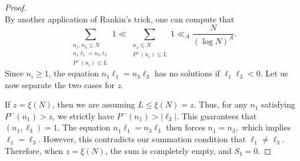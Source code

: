 \documentclass[10pt,a4paper]{amsart}
\renewcommand{\geq}{\geqslant}
\renewcommand{\l}{\ell}
\renewcommand{\le}{\leqslant}
\renewcommand{\leq}{\leqslant}
\begin{document}
\begin{proof}
\begin{equation}
		\end{equation}
		By another application of Rankin's trick, one can compute that 
		\begin{equation}\label{eq: proof lem 4.3 1}
			\sum_{\substack{n_1,n_3 \le N \\ n_1\l_1=n_3\l_3  \\ P^+(n_i) \leq L }} 1 \ll \sum_{\substack{n_1\leq N \\ P^+(n_i) \leq L }} 1 \ll_A \frac{N}{(\log N)^A}.
		\end{equation}
		Since $n_i \geq 1$, the equation $n_1\l_1=n_3\l_3$ has no solutions if $\l_1\l_3 < 0$. Let us now separate the two cases for $z$. 
		
		If $z = \xi(N)$, then we are assuming $L \leq \xi(N) = z$. Thus, for any $n_1$ satisfying $P^-(n_1) > z$, we strictly have $P^-(n_1) > |\l_3|$. This guarantees that $(n_1,\l_3) = 1$. The equation $n_1\l_1=n_3\l_3$ then forces $n_1 = n_3,$ which implies $\l_1 = \l_3$. However, this contradicts our summation condition that $\l_1 \ne \l_3$. Therefore, when $z = \xi(N)$, the sum is completely empty, and $S_1 = 0$.
		

\end{proof}
\end{document}
